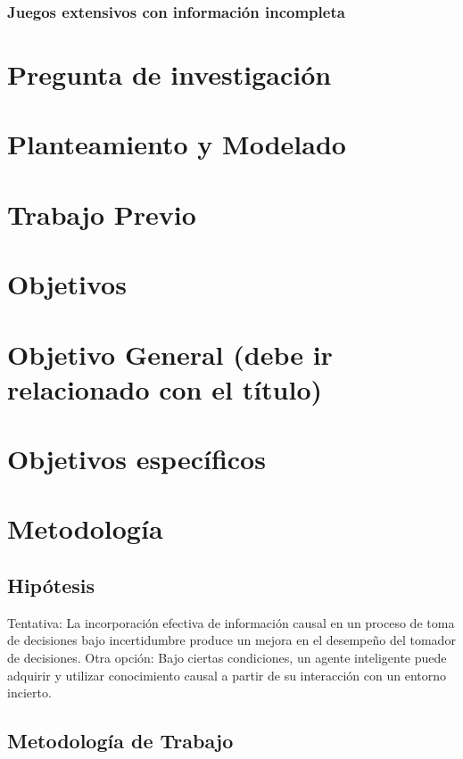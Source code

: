 \documentclass[11pt]{article}
\theoremstyle{plain}
\begin{document}
		\subsubsection{Juegos extensivos con información incompleta}
		
	

\section{Pregunta de investigación}
\section{Planteamiento y Modelado}

\section{Trabajo Previo}

\section{Objetivos}
	\section{Objetivo General (debe ir relacionado con el título)}
	\section{Objetivos específicos}
	
\section{Metodología}
	\subsection{Hipótesis}
	Tentativa: La incorporación efectiva de información causal en un proceso de toma de decisiones bajo incertidumbre produce un mejora en el desempeño del tomador de decisiones.
	Otra opción: Bajo ciertas condiciones, un agente inteligente puede adquirir y utilizar conocimiento causal a partir de su interacción con un entorno incierto.
	\subsection{Metodología de Trabajo}
\end{document}

